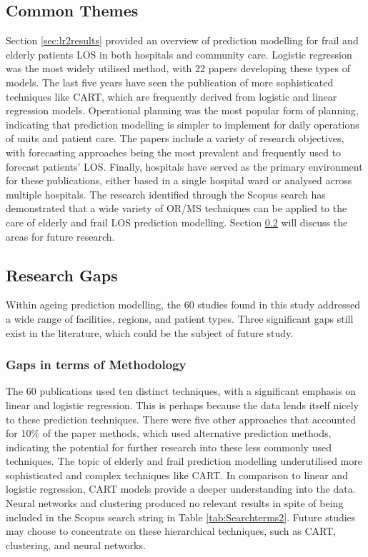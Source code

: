 \documentclass[../thesis.tex]{subfiles}
\begin{document}
\subsection{Common Themes}
Section \ref{sec:lr2results} provided an overview of prediction modelling for frail and elderly patients LOS in both hospitals and community care. Logistic regression was the most widely utilised method, with 22 papers developing these types of models. The last five years have seen the publication of more sophisticated techniques like CART, which are frequently derived from logistic and linear regression models. Operational planning was the most popular form of planning, indicating that prediction modelling is simpler to implement for daily operations of units and patient care. The papers include a variety of research objectives, with forecasting approaches being the most prevalent and frequently used to forecast patients' LOS. Finally,  hospitals have served as the primary environment for these publications, either based in a single hospital ward or analysed across multiple hospitals. The research identified through the Scopus search has demonstrated that a wide variety of OR/MS techniques can be applied to the care of elderly and frail LOS prediction modelling. Section \ref{sec:lr2researchgaps} will discuss the areas for future research.

\subsection{Research Gaps}\label{sec:lr2researchgaps}
Within ageing prediction modelling, the 60 studies found in this study addressed a wide range of facilities, regions, and patient types. Three significant gaps still exist in the literature, which could be the subject of future study.

\subsubsection{Gaps in terms of Methodology}

The 60 publications used ten distinct techniques, with a significant emphasis on linear and logistic regression. This is perhaps because the data lends itself nicely to these prediction techniques. There were five other approaches that accounted for 10\% of the paper methods, which used alternative prediction methods, indicating the potential for further research into these less commonly used techniques. The topic of elderly and frail prediction modelling underutilised more sophisticated and complex techniques like CART. In comparison to linear and logistic regression, CART models provide a deeper understanding into the data. Neural networks and clustering produced no relevant results in spite of being included in the Scopus search string in Table \ref{tab:Searchterms2}. Future studies may choose to concentrate on these hierarchical techniques, such as CART, clustering, and neural networks.
\end{document}
